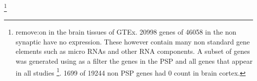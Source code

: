 \footnote{remove:on in the brain tissues of GTEx. 20998 genes of 46058 in the non synaptic have no expression. These however contain many non standard gene elements such as micro RNAs and other RNA components. A subset of genes was generated using as a filter the genes in the PSP and all genes that appear in all studies  \footnote{\textcolor{red}{may want to change this to any study and will need to change graph again}}. 1699 of 19244 non PSP genes had 0 count in brain cortex.}







 


